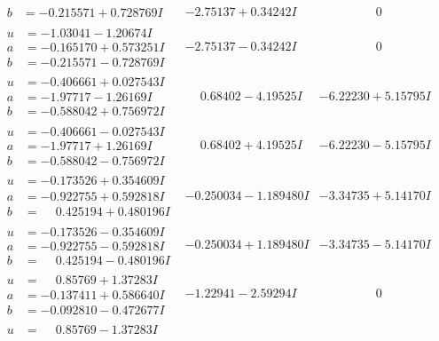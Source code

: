 \documentclass[1p]{elsarticle_modified}
\theoremstyle{definition}
\begin{document}
$$\begin{array}{c|c|c}
\begin{aligned}
b &= -0.215571 + 0.728769 I\end{aligned}
 & -2.75137 + 0.34242 I & \phantom{-0.000000 } 0 \\ \hline\begin{aligned}
u &= -1.03041 - 1.20674 I \\
a &= -0.165170 + 0.573251 I \\
b &= -0.215571 - 0.728769 I\end{aligned}
 & -2.75137 - 0.34242 I & \phantom{-0.000000 } 0 \\ \hline\begin{aligned}
u &= -0.406661 + 0.027543 I \\
a &= -1.97717 - 1.26169 I \\
b &= -0.588042 + 0.756972 I\end{aligned}
 & \phantom{-}0.68402 - 4.19525 I & -6.22230 + 5.15795 I \\ \hline\begin{aligned}
u &= -0.406661 - 0.027543 I \\
a &= -1.97717 + 1.26169 I \\
b &= -0.588042 - 0.756972 I\end{aligned}
 & \phantom{-}0.68402 + 4.19525 I & -6.22230 - 5.15795 I \\ \hline\begin{aligned}
u &= -0.173526 + 0.354609 I \\
a &= -0.922755 + 0.592818 I \\
b &= \phantom{-}0.425194 + 0.480196 I\end{aligned}
 & -0.250034 - 1.189480 I & -3.34735 + 5.14170 I \\ \hline\begin{aligned}
u &= -0.173526 - 0.354609 I \\
a &= -0.922755 - 0.592818 I \\
b &= \phantom{-}0.425194 - 0.480196 I\end{aligned}
 & -0.250034 + 1.189480 I & -3.34735 - 5.14170 I \\ \hline\begin{aligned}
u &= \phantom{-}0.85769 + 1.37283 I \\
a &= -0.137411 + 0.586640 I \\
b &= -0.092810 - 0.472677 I\end{aligned}
 & -1.22941 - 2.59294 I & \phantom{-0.000000 } 0 \\ \hline\begin{aligned}
u &= \phantom{-}0.85769 - 1.37283 I \\

\end{aligned}
\end{array}$$
\end{document}
